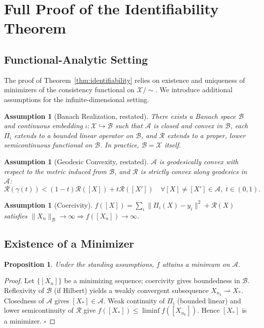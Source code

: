 \documentclass[12pt, oneside]{article}
\newtheorem{proposition}[theorem]{Proposition}
\newtheorem{assumption}[theorem]{Assumption}
\newcommand{\Xmod}{\mathcal{X}/{\sim}}
\begin{document}
\section{Full Proof of the Identifiability Theorem}
\label{app:identifiability}

\subsection{Functional-Analytic Setting}

The proof of Theorem~\ref{thm:identifiability} relies on existence and uniqueness of
minimizers of the consistency functional on $\Xmod$. We introduce additional assumptions
for the infinite-dimensional setting.

\begin{assumption}[Banach Realization, restated]
There exists a Banach space $\mathcal{B}$ and continuous embedding
$\iota : \mathcal{X} \hookrightarrow \mathcal{B}$ such that $\mathcal{A}$ is closed and
convex in $\mathcal{B}$, each $\Pi_i$ extends to a bounded linear operator on $\mathcal{B}$,
and $\mathcal{R}$ extends to a proper, lower semicontinuous functional on $\mathcal{B}$.
In practice, $\mathcal{B} = \mathcal{X}$ itself.
\end{assumption}

\begin{assumption}[Geodesic Convexity, restated]
$\mathcal{A}$ is geodesically convex with respect to the metric induced from $\mathcal{B}$,
and $\mathcal{R}$ is strictly convex along geodesics in $\mathcal{A}$:
\[
\mathcal{R}(\gamma(t)) < (1-t)\mathcal{R}([X]) + t\mathcal{R}([X'])
\quad \forall [X] \ne [X'] \in \mathcal{A},\; t \in (0,1).
\]
\end{assumption}

\begin{assumption}[Coercivity]
$f([X]) = \sum_i \|\Pi_i(X)-y_i\|^2 + \mathcal{R}(X)$ satisfies
$\|X_n\|_{\mathcal{B}} \to \infty \Rightarrow f([X_n]) \to \infty$.
\end{assumption}

\subsection{Existence of a Minimizer}

\begin{proposition}
Under the standing assumptions, $f$ attains a minimum on $\mathcal{A}$.
\end{proposition}
\begin{proof}
Let $\{[X_n]\}$ be a minimizing sequence; coercivity gives boundedness in $\mathcal{B}$.
Reflexivity of $\mathcal{B}$ (if Hilbert) yields a weakly convergent subsequence
$X_{n_k} \rightharpoonup X_*$. Closedness of $\mathcal{A}$ gives $[X_*] \in \mathcal{A}$.
Weak continuity of $\Pi_i$ (bounded linear) and lower semicontinuity of $\mathcal{R}$
give $f([X_*]) \le \liminf f([X_{n_k}])$. Hence $[X_*]$ is a minimizer. $\square$
\end{proof}
\end{document}
